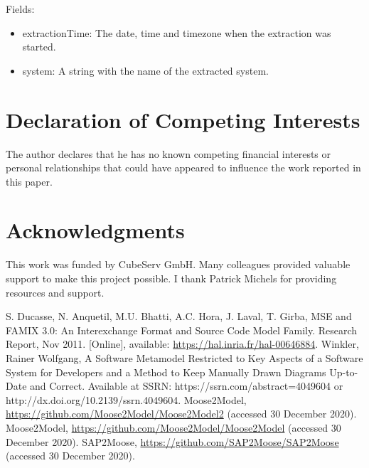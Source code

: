\documentclass[preprint,12pt]{elsarticle}
\begin{document}
Fields:
\begin{itemize}
\item extractionTime: The date, time and timezone when the extraction was started.
\item system: A string with the name of the extracted system.
\end{itemize}


\section*{Declaration of Competing Interests} 
The author declares that he has no known competing financial interests or personal relationships that could have appeared to influence the work reported in this paper.

\section*{Acknowledgments}

This work was funded by CubeServ GmbH.
Many colleagues provided valuable support to make this project possible.
I thank
Patrick Michels for providing resources and support.



\begin{thebibliography}{00}
S. Ducasse, N. Anquetil, M.U. Bhatti, A.C. Hora, J. Laval, T. Girba, MSE and FAMIX 3.0: An Interexchange Format and Source Code Model Family. Research Report, Nov 2011. [Online], available: \url{https://hal.inria.fr/hal-00646884}.
Winkler, Rainer Wolfgang, A Software Metamodel Restricted to Key Aspects of a Software System for Developers and a Method to Keep Manually Drawn Diagrams Up-to-Date and Correct. Available at SSRN: https://ssrn.com/abstract=4049604 or http://dx.doi.org/10.2139/ssrn.4049604.
Moose2Model, \url{https://github.com/Moose2Model/Moose2Model2} (accessed 30 December 2020).
Moose2Model, \url{https://github.com/Moose2Model/Moose2Model} (accessed 30 December 2020).
SAP2Moose, \url{https://github.com/SAP2Moose/SAP2Moose} (accessed 30 December 2020).

\end{thebibliography}
\end{document}
